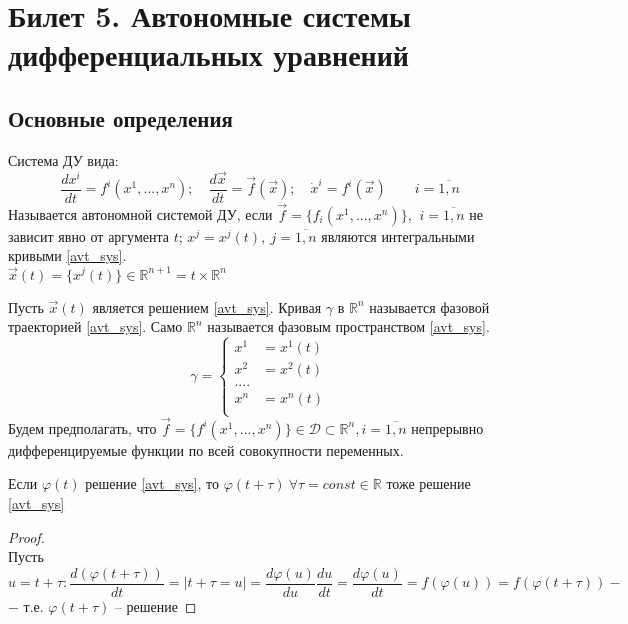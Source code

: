 
\section{Билет 5. Автономные системы дифференциальных уравнений}

\subsection{Основные определения}
Система ДУ вида: 
\begin{equation}\label{avt_sys}
	\frac{dx^i}{dt} = f^i(x^1, ..., x^n); \quad \frac{d\vec{x}}{dt} = \vec{f}(\vec{x}); \quad 	\dot{x}^i = f^i(\vec{x}) \quad \quad i = \overline{1, n}
\end{equation}
Называется автономной системой ДУ, если $ \vec{f} = \{f_i(x^1, ..., x^n)\} $,  $\ i = \overline{1, n}$ не зависит явно от аргумента $ t $; $ x^j = x^j(t), \ j = \overline{1, n} $ являются интегральными кривыми \eqref{avt_sys}. \\ $\vec{x}(t) = \{ x^j(t) \} \in \mathbb{R}^{n+1} = t \times \mathbb{R}^n$
\begin{definition}
	Пусть $ \vec{x}(t) $ является решением \eqref{avt_sys}. Кривая $ \gamma $ в $ \mathbb{R}^n $ называется фазовой траекторией \eqref{avt_sys}. Само $ \mathbb{R}^n $ называется фазовым пространством \eqref{avt_sys}.
	\begin{equation}\label{gamma_sys}
		\gamma = \left\{
			\begin{aligned}
				x^1 &= x^1(t) \\
				x^2 &=x^2(t) \\
				.... \\
				x^n &= x^n(t) \\
			\end{aligned}
		\right.
	\end{equation}
	Будем предполагать, что $ \vec{f} = \{ f^i(x^1, ..., x^n) \} \in \mathscr{D} \subset \mathbb{R}^n, i = \overline{1, n} $ непрерывно дифференцируемые функции по всей совокупности переменных.
\end{definition}

\begin{theorem}
	Если $ \varphi(t) $ решение \eqref{avt_sys}, то $ \varphi(t + \tau) \ \forall \tau = const \in \mathbb{R}$ тоже решение \eqref{avt_sys}
\end{theorem}

\begin{proof}
	\ \\
	Пусть $ u = t + \tau: \dfrac{d(\varphi(t + \tau))}{dt} = | t + \tau = u | = \dfrac{d \varphi(u)}{du} \dfrac{du}{dt} = \dfrac{d \varphi(u)}{dt} = f(\varphi(u)) = f(\varphi(t + \tau))-$ \\ $-$ т.е. $\varphi(t + \tau)$ -- решение
\end{proof}

